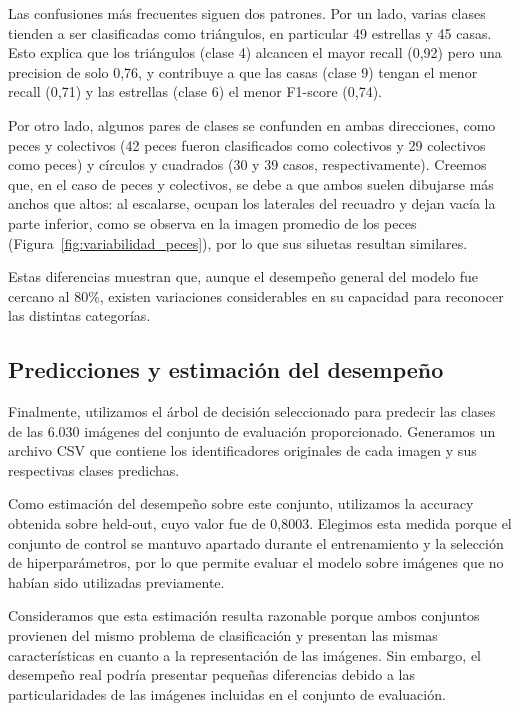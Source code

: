 \documentclass[11pt,a4paper]{article}
\begin{document}
\newpage

Las confusiones más frecuentes siguen dos patrones. 
Por un lado, varias clases tienden a ser clasificadas 
como triángulos,  en particular 49 estrellas y 45 casas. 
Esto explica que los triángulos (clase 4) alcancen 
el mayor recall (0,92) pero una precision de solo 0,76, 
y contribuye a que las casas (clase 9) tengan 
el menor recall (0,71) y las estrellas (clase 6)
 el menor F1-score (0,74). 

Por otro lado, algunos pares de clases se confunden
en ambas direcciones, como peces y colectivos 
(42 peces fueron clasificados como colectivos y 29 
colectivos como peces) y círculos y cuadrados 
(30 y 39 casos, respectivamente). 
Creemos que, en el caso de peces y colectivos, 
se debe a que ambos suelen dibujarse más anchos 
que altos: al escalarse, ocupan los laterales del recuadro 
y dejan vacía la parte inferior, como se observa en la 
imagen promedio de los peces 
(Figura~\ref{fig:variabilidad_peces}), por lo que
sus siluetas resultan similares.

Estas diferencias muestran que,
aunque el desempeño general del modelo
fue cercano al 80\%, existen variaciones
considerables en su capacidad para
reconocer las distintas categorías.


\subsection{Predicciones y estimación del desempeño}

Finalmente, utilizamos el árbol de decisión
seleccionado para predecir las clases de las
6.030 imágenes del conjunto de evaluación
proporcionado. Generamos un
archivo CSV que contiene los identificadores
originales de cada imagen y sus respectivas
clases predichas.

Como estimación del desempeño sobre este
conjunto, utilizamos la accuracy obtenida
sobre held-out, cuyo valor fue de 0,8003.
Elegimos esta medida porque el conjunto de
control se mantuvo apartado durante el
entrenamiento y la selección de hiperparámetros,
por lo que permite evaluar el modelo sobre
imágenes que no habían sido utilizadas
previamente.

Consideramos que esta estimación resulta
razonable porque ambos conjuntos provienen
del mismo problema de clasificación y
presentan las mismas características en
cuanto a la representación de las imágenes.
Sin embargo, el desempeño real podría
presentar pequeñas diferencias debido a
las particularidades de las imágenes
incluidas en el conjunto de evaluación.
\end{document}
